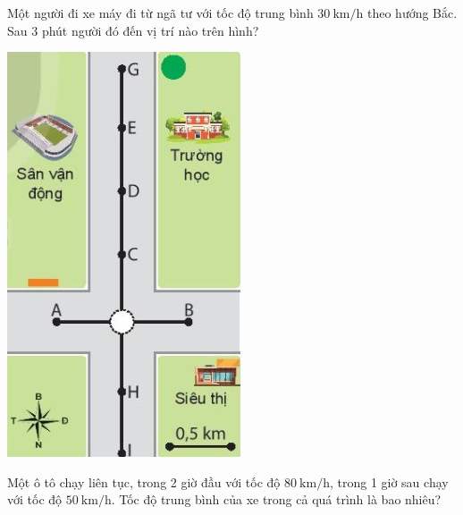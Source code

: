 \begin{ex}
	Một người đi xe máy đi từ ngã tư với tốc độ trung bình $\SI{30}{\kilo\meter/\hour}$ theo hướng Bắc. Sau 3 phút người đó đến vị trí nào trên hình?
	\begin{center}
		\includegraphics[scale=0.5]{figs/G10Y25B3-17}
	\end{center}
\end{ex}

\begin{ex}
	Một ô tô chạy liên tục, trong 2 giờ đầu với tốc độ $\SI{80}{\kilo\meter/\hour}$, trong 1 giờ sau chạy với tốc độ $\SI{50}{\kilo\meter/\hour}$. Tốc độ trung bình của xe trong cả quá trình là bao nhiêu?
\end{ex}

